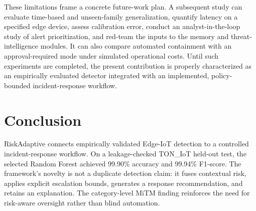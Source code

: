 \documentclass[conference]{IEEEtran}
\begin{document}
These limitations frame a concrete future-work plan. A subsequent study can evaluate time-based and unseen-family generalization, quantify latency on a specified edge device, assess calibration error, conduct an analyst-in-the-loop study of alert prioritization, and red-team the inputs to the memory and threat-intelligence modules. It can also compare automated containment with an approval-required mode under simulated operational costs. Until such experiments are completed, the present contribution is properly characterized as an empirically evaluated detector integrated with an implemented, policy-bounded incident-response workflow.

\section{Conclusion}
RiskAdaptive connects empirically validated Edge-IoT detection to a controlled incident-response workflow. On a leakage-checked TON\_IoT held-out test, the selected Random Forest achieved 99.90\% accuracy and 99.94\% F1-score. The framework's novelty is not a duplicate detection claim: it fuses contextual risk, applies explicit escalation bounds, generates a response recommendation, and retains an explanation. The category-level MiTM finding reinforces the need for risk-aware oversight rather than blind automation.
\end{document}
